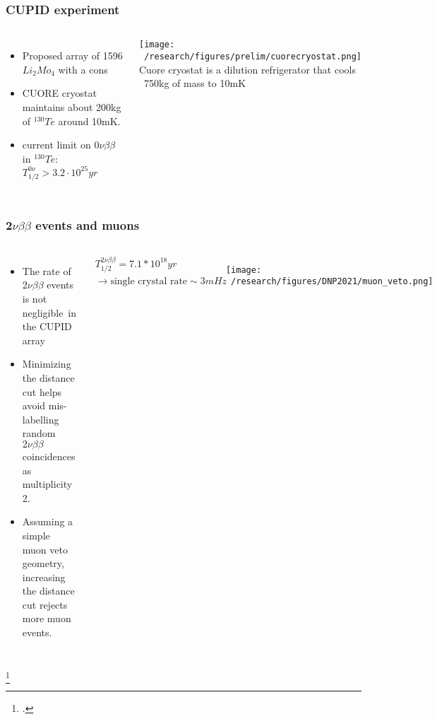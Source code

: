 \documentclass{beamer}
\begin{document}
	\begin{frame}
		\frametitle{CUPID experiment}
		\begin{columns}[c] %
			
			\begin{itemize}
			\item Proposed array of 1596 $Li_2Mo_4$ with a cons
			\item CUORE	cryostat maintains about 200kg of $^{130}Te$ around 10mK.
			\item current limit on $0\nu\beta\beta$ in $^{130}Te$: $T_{1/2}^{0\nu} > 3.2\cdot 10^{25}yr$ 
			\end{itemize}			 
			
		
			\texttt{[image: ~/research/figures/prelim/cuorecryostat.png]}
			{\footnotesize Cuore cryostat is a dilution refrigerator that cools ~750kg of mass to 10mK }
			
		\end{columns}
	\end{frame}	
	
	\begin{frame}
		\frametitle{2$\nu\beta\beta$ events and muons}
		\begin{columns}[c] %
			
			\begin{itemize}
				\setlength\itemsep{2em}				
				\item The rate of $2\nu\beta\beta$ events is not negligible\footnotemark \ in the CUPID array
				\item Minimizing the distance cut helps avoid mis-labelling random $2\nu\beta\beta$ coincidences as multiplicity 2.
				\item Assuming a simple muon veto geometry, increasing the distance cut rejects more muon events.
			\end{itemize}
			
			\begin{eqnarray*}
			T_{1/2}^{2\nu\beta\beta} = 7.1* 10^{18} yr \\ 
			\rightarrow \text{single crystal rate} \sim 3mHz
			\end{eqnarray*}			
			
			\begin{figure}
			\texttt{[image: ~/research/figures/DNP2021/muon\_veto.png]}
			\end{figure}
			
		\end{columns}
		\footcitetext{arxiv.org/abs/1912.07272}
	\end{frame}
\end{document}
